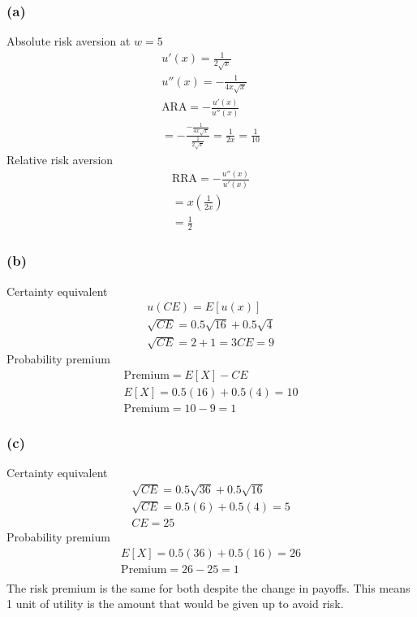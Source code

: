 \documentclass[10pt, a4paper]{article}
\begin{document}
      \subsubsection*{(a)}
        Absolute risk aversion at $w=5$
          \begin{gather*}
            u'(x) = \frac{1}{2\sqrt{x}}\\
            u''(x) = -\frac{1}{4x\sqrt{x}}\\
            \text{ARA} = -\frac{u'(x)}{u''(x)} \\
            = -\frac{-\frac{1}{4x\sqrt{x}}}{\frac{1}{2\sqrt{x}}}
            = \frac{1}{2x}
            = \frac{1}{10}
          \end{gather*}
        Relative risk aversion
          \begin{gather*}
            \text{RRA} = -\frac{u''(x)}{u'(x)}\\
            = x(\frac{1}{2x})\\
            =\frac{1}{2}
          \end{gather*}
      \subsubsection*{(b)}
        Certainty equivalent
          \begin{gather*}
            u(CE) = E[u(x)]\\
            \sqrt{CE} = 0.5\sqrt{16} + 0.5\sqrt{4}\\
            \sqrt{CE} = 2 + 1 = 3
            CE = 9
          \end{gather*}
        Probability premium
          \begin{gather*}
            \text{Premium} = E[X] - CE \\
            E[X] = 0.5(16) + 0.5(4) = 10 \\
            \text{Premium} = 10 - 9 = 1
          \end{gather*}
      \subsubsection*{(c)}
        Certainty equivalent
          \begin{gather*}
            \sqrt{CE} = 0.5\sqrt{36} + 0.5\sqrt{16} \\
            \sqrt{CE} = 0.5(6) + 0.5(4) = 5 \\
            CE = 25
          \end{gather*}
        Probability premium
          \begin{gather*}
            E[X] = 0.5(36) + 0.5(16) = 26 \\
            \text{Premium} = 26-25 = 1 \\
          \end{gather*}
        The risk premium is the same for both despite the change in payoffs. This means 1 unit of utility is the amount that would be given up to avoid risk.
\end{document}
